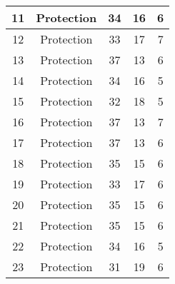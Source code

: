 \documentclass[results.tex]{subfiles}
\begin{document}
\begin{center}
\begin{tabular}{| c || c | c | c | c |}
            \hline
            11                      & Protection                   & 34                     & 16                      & 6                    \\
            \hline
            12                      & Protection                   & 33                     & 17                      & 7                    \\
            \hline
            13                      & Protection                   & 37                     & 13                      & 6                    \\
            \hline
            14                      & Protection                   & 34                     & 16                      & 5                    \\
            \hline
            15                      & Protection                   & 32                     & 18                      & 5                    \\
            \hline
            16                      & Protection                   & 37                     & 13                      & 7                    \\
            \hline
            17                      & Protection                   & 37                     & 13                      & 6                    \\
            \hline
            18                      & Protection                   & 35                     & 15                      & 6                    \\
            \hline
            19                      & Protection                   & 33                     & 17                      & 6                    \\
            \hline
            20                      & Protection                   & 35                     & 15                      & 6                    \\
            \hline
            21                      & Protection                   & 35                     & 15                      & 6                    \\
            \hline
            22                      & Protection                   & 34                     & 16                      & 5                    \\
            \hline
            23                      & Protection                   & 31                     & 19                      & 6                    \\

\end{tabular}
\end{center}
\end{document}
